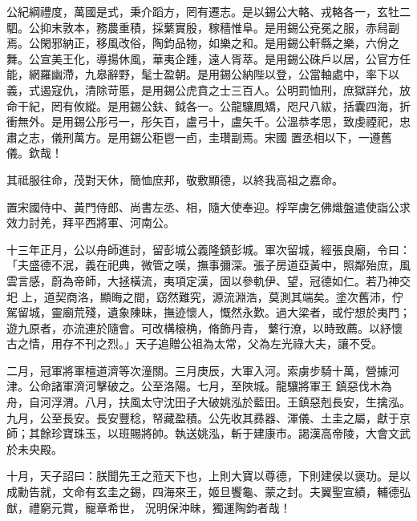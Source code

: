 \begin{pinyinscope}
 公紀綱禮度，萬國是式，秉介蹈方，罔有遷志。是以錫公大輅、戎輅各一，玄牡二駟。公抑末敦本，務農重積，採蘩實殷，稼穡惟阜。是用錫公兗冕之服，赤舄副焉。公閑邪納正，移風改俗，陶鈞品物，如樂之和。是用錫公軒縣之樂，六佾之
 舞。公宣美王化，導揚休風，華夷企踵，遠人胥萃。是用錫公硃戶以居，公官方任能，網羅幽滯，九皋辭野，髦士盈朝。是用錫公納陛以登，公當軸處中，率下以義，式遏寇仇，清除苛慝，是用錫公虎賁之士三百人。公明罰恤刑，庶獄詳允，放命干紀，罔有攸縱。是用錫公鈇、鉞各一。公龍驤鳳矯，咫尺八紱，括囊四海，折衝無外。是用錫公彤弓一，彤矢百，盧弓十，盧矢千。公溫恭孝思，致虔禋祀，忠肅之志，儀刑萬方。是用錫公秬鬯一卣，圭瓚副焉。宋國
 置丞相以下，一遵舊儀。欽哉！



 其祗服往命，茂對天休，簡恤庶邦，敬敷顯德，以終我高祖之嘉命。



 置宋國侍中、黃門侍郎、尚書左丞、相，隨大使奉迎。桴罕虜乞佛熾盤遣使詣公求效力討羌，拜平西將軍、河南公。



 十三年正月，公以舟師進討，留彭城公義隆鎮彭城。軍次留城，經張良廟，令曰：「夫盛德不泯，義在祀典，微管之嘆，撫事彌深。張子房道亞黃中，照鄰殆庶，風雲言感，蔚為帝師，大拯橫流，夷項定漢，固以參軌伊、望，冠德如仁。若乃神交圯
 上，道契商洛，顯晦之間，窈然難究，源流淵浩，莫測其端矣。塗次舊沛，佇駕留城，靈廟荒殘，遺象陳昧，撫迹懷人，慨然永歎。過大梁者，或佇想於夷門；遊九原者，亦流連於隨會。可改構榱桷，脩飾丹青，蘩行潦，以時致薦。以紓懷古之情，用存不刊之烈。」天子追贈公祖為太常，父為左光祿大夫，讓不受。



 二月，冠軍將軍檀道濟等次潼關。三月庚辰，大軍入河。索虜步騎十萬，營據河津。公命諸軍濟河擊破之。公至洛陽。七月，至陜城。龍驤將軍王
 鎮惡伐木為舟，自河浮渭。八月，扶風太守沈田子大破姚泓於藍田。王鎮惡剋長安，生擒泓。九月，公至長安。長安豐稔，帑藏盈積。公先收其彞器、渾儀、土圭之屬，獻于京師；其餘珍寶珠玉，以班賜將帥。執送姚泓，斬于建康市。謁漢高帝陵，大會文武於未央殿。



 十月，天子詔曰：朕聞先王之蒞天下也，上則大寶以尊德，下則建侯以褒功。是以成勳告就，文命有玄圭之錫，四海來王，姬旦饗龜、蒙之封。夫翼聖宣績，輔德弘猷，禮窮元賞，寵章希世，
 況明保沖昧，獨運陶鈞者哉！




\end{pinyinscope}
